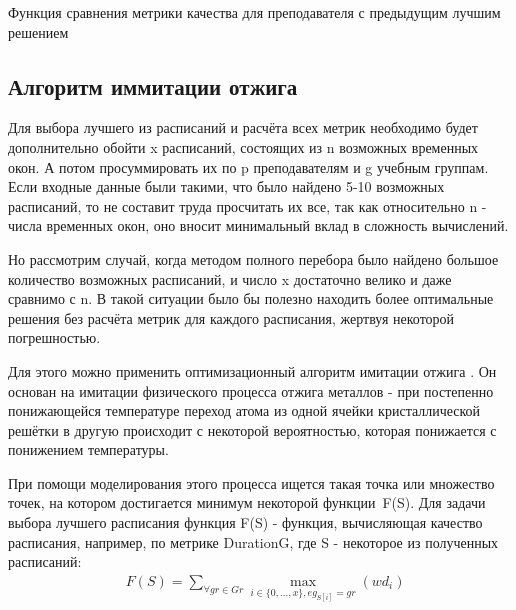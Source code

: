 \begin{algorithm} 
	\nonl{}
	\caption{Функция сравнения метрики качества для преподавателя с предыдущим лучшим решением}	
	\label{alg:algoW}
\end{algorithm} 


\subsection{Алгоритм иммитации отжига}
Для выбора лучшего из расписаний и расчёта всех метрик необходимо будет дополнительно обойти x расписаний, состоящих из n возможных временных окон. А потом просуммировать их по p преподавателям и g учебным группам. 
Если входные данные были такими, что было найдено 5-10 возможных расписаний, то не составит труда просчитать их все, так как относительно n - числа временных окон, оно вносит минимальный вклад в сложность вычислений.

Но рассмотрим случай, когда методом полного перебора было найдено большое количество возможных расписаний, и число x достаточно велико и даже сравнимо с n. В такой ситуации было бы полезно находить более оптимальные решения без расчёта метрик для каждого расписания, жертвуя некоторой погрешностью.

Для этого можно применить оптимизационный алгоритм имитации отжига \cite{sim}. Он основан на имитации физического процесса отжига металлов - при постепенно понижающейся температуре переход атома из одной ячейки кристаллической решётки в другую происходит с некоторой вероятностью, которая понижается с понижением температуры.

При помощи моделирования этого процесса ищется такая точка или множество точек, на котором достигается минимум некоторой функции F(S). Для задачи выбора лучшего расписания функция F(S) - функция, вычисляющая качество расписания, например, по метрике DurationG, где S - некоторое из полученных расписаний:
\begin{align}
	& {F(S)} =  \sum\limits_{\forall  gr \in Gr}\max\limits_{i \in \{0,...,x\}, eg_{S[i]} = gr}(wd_i)
\end{align}

